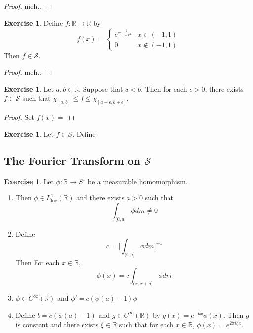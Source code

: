 \documentclass[12pt]{amsart}
\theoremstyle{definition}
\newtheorem{ex}[definition]{Exercise}
\newcommand{\ep}{\epsilon}
\newcommand{\R}{\mathbb{R}}
\newcommand{\MS}{\mathcal{S}}
\newcommand{\loc}{\text{loc}}
\newcommand{\lex}[1]{\label{ex:#1}}
\begin{document}
	\begin{proof}
		meh...
	\end{proof}
	

	\begin{ex}
		Define $f:\R \rightarrow \R$ by 
		\[
		f(x) = 
		\begin{cases}
			e^{- \frac{1}{1-x^2}} & x \in (-1, 1) \\
			0 & x \not \in (-1, 1)
		\end{cases}
		\]
		Then $f \in \MS$.
	\end{ex}
	
	\begin{proof}
		meh...
	\end{proof}

	\begin{ex}
		Let $a,b \in \R$. Suppose that $a < b$. Then for each $\ep >0$, there exists $f \in \MS$ such that $\chi_{[a,b]} \leq f \leq \chi_{[a-\ep , b + \ep]}$.
	\end{ex}

	\begin{proof}
		Set $f(x) = $
	\end{proof}

	\begin{ex}
		Let $f \in \MS$. Define
	\end{ex}
	
	
	
	
	
	
	
	
	
	
	
	
	
	
	
	
	
	
	\newpage
	\subsection{The Fourier Transform on $\MS$}
	
	\begin{ex}
		\lex{300} Let $\phi:\R \rightarrow S^1$ be a measurable homomorphism. 
		\begin{enumerate}
			\item Then $\phi \in L^1_{\loc}(\R)$ and there exists $a > 0$ such that $$\int_{(0,a]}\phi dm \neq 0$$
			\item Define $$c = \bigg[ \int_{(0,a]}\phi dm \bigg]^{-1}$$ 
			Then  For each $x \in \R$, $$\phi(x) = c\int_{(x, x+a]}\phi dm$$ 
			\item $\phi \in C^{\infty}(\R)$ and $\phi' = c(\phi(a) - 1)\phi$
			\item Define $b = c(\phi(a) - 1)$ and $g \in C^{\infty}(\R)$ by $g(x) = e^{-bx} \phi(x)$. Then $g$ is constant and there exists $\xi \in \R$ such that for each $x \in \R$, $\phi(x) = e^{2 \pi i \xi x}$.
		\end{enumerate}
	\end{ex}	
	
\end{document}

